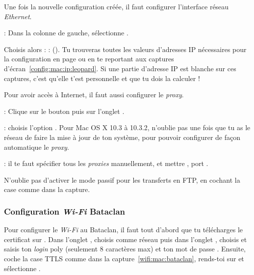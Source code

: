 Une fois la nouvelle configuration créée, il faut configurer l'interface réseau \emph{Ethernet}.



 : Dans la colonne de gauche, sélectionne .

Choisis alors  :%
 :  (). Tu trouveras toutes les valeurs d'adresses IP nécessaires pour la configuration en page \pageref{calcul_ip} ou en te reportant aux captures d'écran~\ref{config:mac:ip:leopard}. Si une partie d'adresse IP est blanche sur ces captures, c'est qu'elle t'est personnelle et que tu dois la calculer !


  
  



Pour avoir accès à Internet, il faut aussi configurer le \emph{proxy}.

 : Clique sur le bouton  puis sur l'onglet .


 :  choisis l'option . Pour Mac OS X 10.3 à 10.3.2, n'oublie pas une fois que tu as le réseau de faire la mise à jour de ton système, pour pouvoir configurer de façon automatique le \emph{proxy}.

 : il te faut spécifier tous les
\emph{proxies} manuellement, et mettre , port .


N'oublie pas d'activer le mode passif pour les transferts en FTP, en cochant la case comme dans la capture.



  
\subsubsection{Configuration \emph{Wi-Fi} Bataclan}

Pour configurer le \emph{Wi-Fi} au Bataclan, il faut tout d'abord que tu télécharges  le certificat sur .
Dans l'onglet , choisis comme réseau  puis dans l'onglet , choisis  et saisis ton \emph{login} poly (seulement 8 caractères max) et ton mot de passe . Ensuite, coche la case TTLS comme dans la capture~\ref{wifi:mac:bataclan}, rends-toi sur  et sélectionne .

